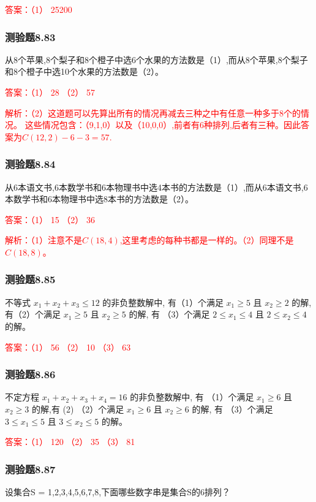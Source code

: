 \documentclass[UTF8, heading=true]{ctexart}
\begin{document}
\textcolor{red}{答案：（1） 25200}

\subsubsection{测验题8.83}

从8个苹果,8个梨子和8个橙子中选6个水果的方法数是（1）,而从8个苹果,8个梨子和8个橙子中选10个水果的方法数是（2）。

\textcolor{red}{答案：（1） 28 （2） 57}

\textcolor{red}{解析：（2）这道题可以先算出所有的情况再减去三种之中有任意一种多于8个的情况。
这些情况包含：（9,1,0）以及（10,0,0）,前者有6种排列,后者有三种。因此答案为$C(12,2)-6-3=57$.}
\subsubsection{测验题8.84}

从6本语文书,6本数学书和6本物理书中选4本书的方法数是（1）,而从6本语文书,6本数学书和6本物理书中选8本书的方法数是（2）。

\textcolor{red}{答案：（1） 15 （2） 36}

\textcolor{red}{解析：（1）注意不是$C(18,4)$,这里考虑的每种书都是一样的。（2）同理不是$C(18,8)$。}


\subsubsection{测验题8.85}

不等式 $x_1+x_2+x_3 \leq 12$ 的非负整数解中, 有（1）个满足 $x_1 \geq 5$ 且 $x_2 \geq 2$ 的解, 有（2）个满足 $x_1 \geq 5$ 且 $x_2 \geq 5$ 的解, 有 （3）个满足 $2 \leq x_1 \leq 4$ 且 $2 \leq x_2 \leq 4$ 的解。

\textcolor{red}{答案：（1） 56 （2） 10 （3） 63}


\subsubsection{测验题8.86}

不定方程 $x_1+x_2+x_3+x_4=16$ 的非负整数解中, 有 （1）个满足 $x_1 \geq 6$ 且 $x_2 \geq 3$ 的解,有 (2)
（2）个满足 $x_1 \geq 6$ 且 $x_2 \geq 6$ 的解, 有 （3）个满足 $3 \leq x_1 \leq 5$ 且 $3 \leq x_2 \leq 5$ 的解。

\textcolor{red}{答案：（1） 120 （2） 35 （3） 81}

\subsubsection{测验题8.87}
设集合S = {1,2,3,4,5,6,7,8},下面哪些数字串是集合S的6排列？
\end{document}
